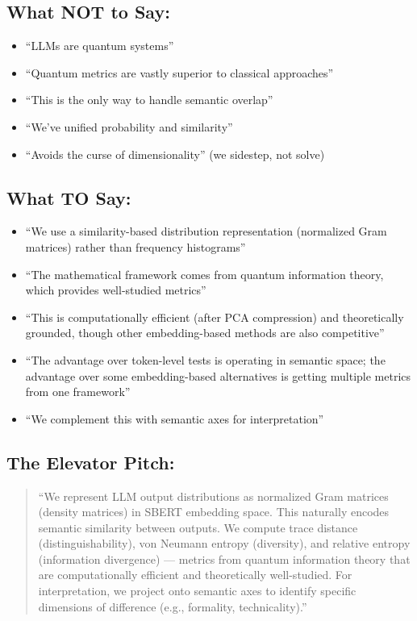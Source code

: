 \documentclass[11pt]{article}
\newcommand{\cmark}{✓}
\newcommand{\xmark}{✗}
\begin{document}
\subsection{What NOT to Say:}

\begin{itemize}
\item[\xmark] ``LLMs are quantum systems''
\item[\xmark] ``Quantum metrics are vastly superior to classical approaches''
\item[\xmark] ``This is the only way to handle semantic overlap''
\item[\xmark] ``We've unified probability and similarity''
\item[\xmark] ``Avoids the curse of dimensionality'' (we sidestep, not solve)
\end{itemize}

\subsection{What TO Say:}

\begin{itemize}
\item[\cmark] ``We use a similarity-based distribution representation (normalized Gram matrices) rather than frequency histograms''
\item[\cmark] ``The mathematical framework comes from quantum information theory, which provides well-studied metrics''
\item[\cmark] ``This is computationally efficient (after PCA compression) and theoretically grounded, though other embedding-based methods are also competitive''
\item[\cmark] ``The advantage over token-level tests is operating in semantic space; the advantage over some embedding-based alternatives is getting multiple metrics from one framework''
\item[\cmark] ``We complement this with semantic axes for interpretation''
\end{itemize}

\subsection{The Elevator Pitch:}

\begin{quote}
``We represent LLM output distributions as normalized Gram matrices (density matrices) in SBERT embedding space. This naturally encodes semantic similarity between outputs. We compute trace distance (distinguishability), von Neumann entropy (diversity), and relative entropy (information divergence) --- metrics from quantum information theory that are computationally efficient and theoretically well-studied. For interpretation, we project onto semantic axes to identify specific dimensions of difference (e.g., formality, technicality).''
\end{quote}
\end{document}
